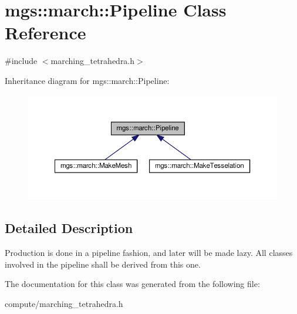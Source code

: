 \hypertarget{classmgs_1_1march_1_1Pipeline}{}\section{mgs\+:\+:march\+:\+:Pipeline Class Reference}
\label{classmgs_1_1march_1_1Pipeline}


{\ttfamily \#include $<$marching\+\_\+tetrahedra.\+h$>$}



Inheritance diagram for mgs\+:\+:march\+:\+:Pipeline\+:
\nopagebreak
\begin{figure}[H]
\begin{center}
\leavevmode
\includegraphics[width=350pt]{classmgs_1_1march_1_1Pipeline__inherit__graph}
\end{center}
\end{figure}


\subsection{Detailed Description}
Production is done in a pipeline fashion, and later will be made lazy. All classes involved in the pipeline shall be derived from this one. 

The documentation for this class was generated from the following file\+:\begin{DoxyCompactItemize}
\item 
compute/marching\+\_\+tetrahedra.\+h\end{DoxyCompactItemize}
